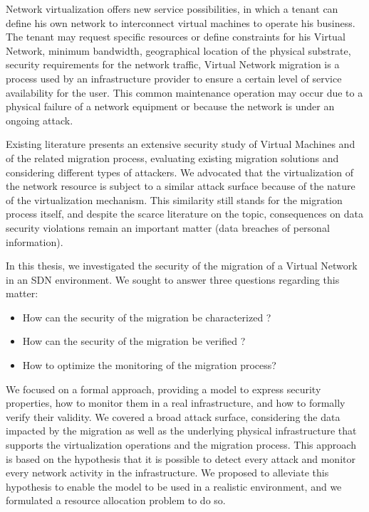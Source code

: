 
\label{sec:thesis_conclusion}
Network virtualization offers new service possibilities, in which a tenant can define his own network to interconnect virtual machines to operate his business. The tenant may request specific resources or define constraints for his Virtual Network, \eg minimum bandwidth, geographical location of the physical substrate, security requirements for the network traffic, \etc
Virtual Network migration is a process used by an infrastructure provider to ensure a certain level of service availability for the user.
This common maintenance operation may occur due to a physical failure of a network equipment or because the network is under an ongoing attack.

Existing literature presents an extensive security study of Virtual Machines and of the related migration process, evaluating existing migration solutions and considering different types of attackers. We advocated that the virtualization of the network resource is subject to a similar attack surface because of the nature of the virtualization mechanism. This similarity still stands for the migration process itself, and despite the scarce literature on the topic, consequences on data security violations remain an important matter (\eg data breaches of personal information).

In this thesis, we investigated the security of the migration of a Virtual Network in an SDN environment. 
We sought to answer three questions regarding this matter:

\begin{itemize}
    \item How can the security of the migration be characterized ?
    \item How can the security of the migration be verified ?
    \item How to optimize the monitoring of the migration process? 
\end{itemize}

We focused on a formal approach, providing a model to express security properties, how to monitor them in a real infrastructure, and how to formally verify their validity. 
We covered a broad attack surface, considering the data impacted by the migration as well as the underlying physical infrastructure that supports the virtualization operations and the migration process. 
This approach is based on the hypothesis that it is possible to detect every attack and monitor every network activity in the infrastructure. 
We proposed to alleviate this hypothesis to enable the model to be used in a realistic environment, and we formulated a resource allocation problem to do so.

